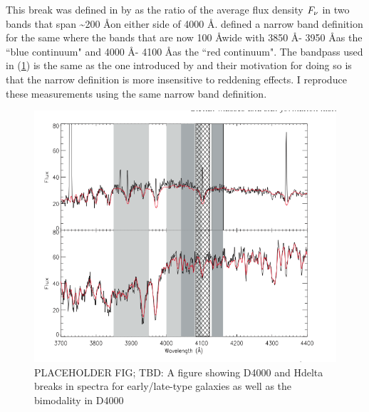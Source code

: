 This break was defined in by \citet{bruzual_a._spectral_1983-2} as the ratio of the average flux density $F_{\rm \nu}$ in two bands that span \textasciitilde200 \AA on either side of 4000 \AA. \citet{1999ApJ...527...54B} defined a narrow band definition for the same where the bands that are now 100 \AA wide with 3850 \AA - 3950 \AA as the ``blue continuum" and 4000 \AA - 4100 \AA as the ``red continuum". The bandpass used in \citet{kauffmann_stellar_2003} (\ref{fig:early_late_type}) is the same as the one introduced by \citet{1999ApJ...527...54B} and their motivation for doing so is that the narrow definition is more insensitive to reddening effects. I reproduce these measurements using the same narrow band definition.\\

\begin{figure}
\includegraphics[width=\textwidth]{figures/spectra_placeholder.png}
\caption[PLACEHOLDER FIG; TBD: A figure showing D4000 and Hdelta breaks in spectra for early/late-type galaxies as well as the bimodality in D4000
]{ PLACEHOLDER FIG; TBD: A figure showing D4000 and Hdelta breaks in spectra for early/late-type galaxies as well as the bimodality in D4000
\label{fig:early_late_type}}
\end{figure}


